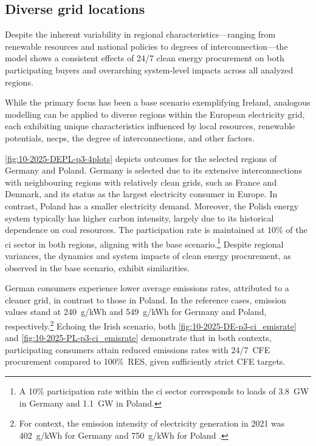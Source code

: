 \subsection{Diverse grid locations}
\label{subsec:location}

\begin{res}
    Despite the inherent variability in regional charac\-teristics---ranging from renewable resources and national policies to degrees of interconnection---the model shows a consistent effects of 24/7 clean energy procurement on both participating buyers and overarching system-level impacts across all analyzed regions.
\end{res}

While the primary focus has been a base scenario exemplifying Ireland, analogous modelling can be applied to diverse regions within the European electricity grid, each exhibiting unique characteristics influenced by local resources, renewable potentials, \gls{necp}s, the degree of interconnections, and other factors. 

\cref{fig:10-2025-DEPL-p3-4plots} depicts outcomes for the selected regions of Germany and Poland. 
Germany is selected due to its extensive interconnections with neighbouring regions with relatively clean grids, such as France and Denmark, and its status as the largest electricity consumer in Europe. 
In contrast, Poland has a smaller electricity demand. 
Moreover, the Polish energy system typically has higher carbon intensity, largely due to its historical dependence on coal resources.
The participation rate is maintained at 10\% of the \gls{ci} sector in both regions, aligning with the base scenario.\footnote{A 10\% participation rate within the \gls{ci} sector corresponds to loads of 3.8~GW in Germany and 1.1~GW in Poland.}
Despite regional variances, the dynamics and system impacts of clean energy procurement, as observed in the base scenario, exhibit similarities.

German consumers experience lower average emissions rates, attributed to a cleaner grid, in contrast to those in Poland.
In the reference cases, emission values stand at 240~g\co/kWh and 549~g\co/kWh for Germany and Poland, respectively.\footnote{For context, the emission intensity of electricity generation in 2021 was 402~g\co/kWh for Germany and 750~g\co/kWh for Poland \cite{EEA-GNGEmissionsEU}.} 
Echoing the Irish scenario, both \cref{fig:10-2025-DE-p3-ci_emisrate} and \cref{fig:10-2025-PL-p3-ci_emisrate} demonstrate that in both contexts, participating consumers attain reduced emissions rates with 24/7~CFE procurement compared to 100\%~RES, given sufficiently strict CFE targets.

